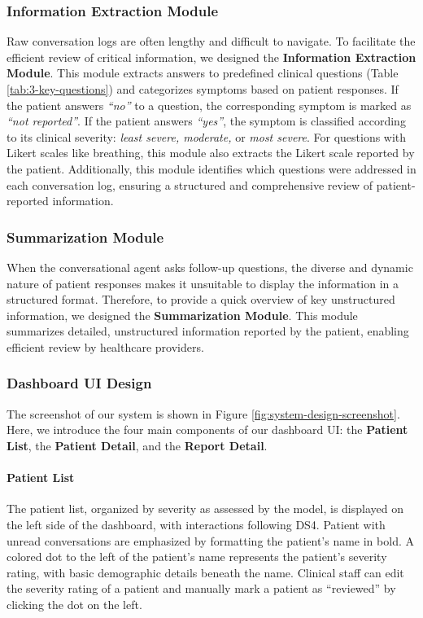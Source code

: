 \subsubsection{Information Extraction Module}
Raw conversation logs are often lengthy and difficult to navigate. To facilitate the efficient review of critical information, we designed the \textbf{Information Extraction Module}.  
This module extracts answers to predefined clinical questions (Table \ref{tab:3-key-questions}) and categorizes symptoms based on patient responses. If the patient answers \textit{``no''} to a question, the corresponding symptom is marked as \textit{``not reported''}. If the patient answers \textit{``yes''}, the symptom is classified according to its clinical severity: \textit{least severe, moderate,} or \textit{most severe}.
For questions with Likert scales like breathing, this module also extracts the Likert scale reported by the patient.
Additionally, this module identifies which questions were addressed in each conversation log, ensuring a structured and comprehensive review of patient-reported information.

\subsubsection{Summarization Module}
When the conversational agent asks follow-up questions, the diverse and dynamic nature of patient responses makes it unsuitable to display the information in a structured format. 
Therefore, to provide a quick overview of key unstructured information, we designed the \textbf{Summarization Module}. This module summarizes detailed, unstructured information reported by the patient, enabling efficient review by healthcare providers.

\subsubsection{Dashboard UI Design}

The screenshot of our system is shown in Figure \ref{fig:system-design-screenshot}. Here, we introduce the four main components of our dashboard UI: the \textbf{Patient List}, the \textbf{Patient Detail}, and the \textbf{Report Detail}.

\paragraph{\textbf{Patient List}}
The patient list, organized by severity as assessed by the model, is displayed on the left side of the dashboard, with interactions following DS4. 
Patient with unread conversations are emphasized by formatting the patient's name in bold.
A colored dot to the left of the patient's name represents the patient's severity rating, with basic demographic details beneath the name. 
Clinical staff can edit the severity rating of a patient and manually mark a patient as ``reviewed'' by clicking the dot on the left.

